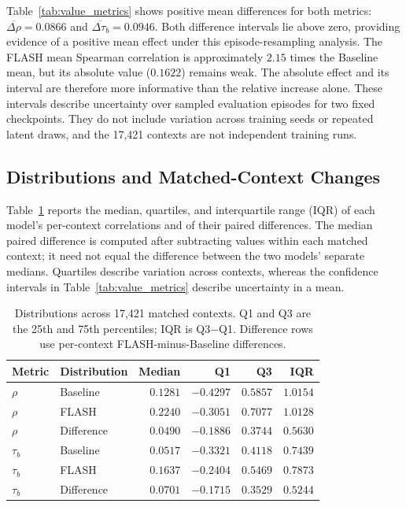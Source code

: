 \documentclass{article} %
\begin{document}
Table~\ref{tab:value_metrics} shows positive mean differences for both metrics: $\overline{\Delta\rho}=0.0866$ and $\overline{\Delta\tau_b}=0.0946$. Both difference intervals lie above zero, providing evidence of a positive mean effect under this episode-resampling analysis. The FLASH mean Spearman correlation is approximately $2.15$ times the Baseline mean, but its absolute value ($0.1622$) remains weak. The absolute effect and its interval are therefore more informative than the relative increase alone. These intervals describe uncertainty over sampled evaluation episodes for two fixed checkpoints. They do not include variation across training seeds or repeated latent draws, and the 17,421 contexts are not independent training runs.

\subsection{Distributions and Matched-Context Changes}
Table~\ref{tab:value_distribution} reports the median, quartiles, and interquartile range (IQR) of each model's per-context correlations and of their paired differences. The median paired difference is computed after subtracting values within each matched context; it need not equal the difference between the two models' separate medians. Quartiles describe variation across contexts, whereas the confidence intervals in Table~\ref{tab:value_metrics} describe uncertainty in a mean.

\begin{table}[!t]
\centering
\small
\caption{Distributions across 17,421 matched contexts. Q1 and Q3 are the 25th and 75th percentiles; IQR is Q3$-$Q1. Difference rows use per-context FLASH-minus-Baseline differences.}
\label{tab:value_distribution}
\begin{tabular}{llrrrr}
\toprule
Metric & Distribution & Median & Q1 & Q3 & IQR \\
\midrule
$\rho$ & Baseline & $0.1281$ & $-0.4297$ & $0.5857$ & $1.0154$ \\
$\rho$ & FLASH & $0.2240$ & $-0.3051$ & $0.7077$ & $1.0128$ \\
$\rho$ & Difference & $0.0490$ & $-0.1886$ & $0.3744$ & $0.5630$ \\
\midrule
$\tau_b$ & Baseline & $0.0517$ & $-0.3321$ & $0.4118$ & $0.7439$ \\
$\tau_b$ & FLASH & $0.1637$ & $-0.2404$ & $0.5469$ & $0.7873$ \\
$\tau_b$ & Difference & $0.0701$ & $-0.1715$ & $0.3529$ & $0.5244$ \\
\bottomrule
\end{tabular}
\end{table}
\end{document}
